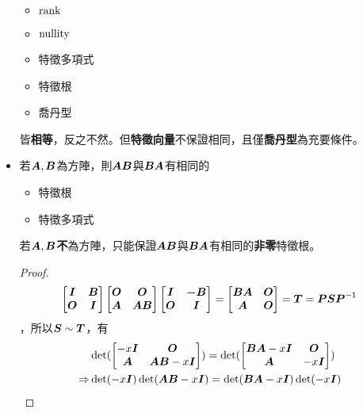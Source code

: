 \begin{itemize}
\begin{itemize}
		\item $\operatorname{rank}$
		\item $\operatorname{nullity}$
		\item 特徵多項式
		\item 特徵根
		\item 喬丹型
	\end{itemize}
    皆\textbf{相等}，反之不然。但\textbf{特徵向量}不保證相同，且僅\textbf{喬丹型}為充要條件。
    \item 若$\boldsymbol{A}, \boldsymbol{B}$為方陣，則$\boldsymbol{AB}$與$\boldsymbol{BA}$有相同的
	\begin{itemize}
		\item 特徵根
		\item 特徵多項式
	\end{itemize}
	若$\boldsymbol{A}, \boldsymbol{B}$\textbf{不}為方陣，只能保證$\boldsymbol{AB}$與$\boldsymbol{BA}$有相同的\textbf{非零}特徵根。 \\
	\begin{proof} \begin{equation}
			\begin{bmatrix}
				\boldsymbol{I} & \boldsymbol{B} \\
				\boldsymbol{O} & \boldsymbol{I}
			\end{bmatrix}
			\begin{bmatrix}
				\boldsymbol{O} & \boldsymbol{O} \\
				\boldsymbol{A} & \boldsymbol{AB}
			\end{bmatrix}
			\begin{bmatrix}
				\boldsymbol{I} & \boldsymbol{-B} \\
				\boldsymbol{O} & \boldsymbol{I}
			\end{bmatrix} = 
			\begin{bmatrix}
				\boldsymbol{BA} & \boldsymbol{O} \\
				\boldsymbol{A} & \boldsymbol{O}
			\end{bmatrix} = \boldsymbol{T} = \boldsymbol{P}\boldsymbol{S}\boldsymbol{P}^{\mathsf{-1}}
		\end{equation}，所以$\boldsymbol{S} \sim \boldsymbol{T}$，有\begin{equation}
			\begin{aligned} 
				& \det(\begin{bmatrix}
					-x\mat{I} & \mat{O} \\
					\mat{A} & \mat{AB} - x\mat{I}
				\end{bmatrix}) = 
				\det(\begin{bmatrix}
					\mat{BA} - x\mat{I} & \mat{O} \\
					\mat{A} & -x\mat{I}
				\end{bmatrix}) \\
				\Rightarrow & \det(-x\mat{I})\det(\mat{AB} - x\mat{I}) = \det(\mat{BA} - x\mat{I})\det(-x\mat{I}) \\

\end{aligned}
\end{equation}
\end{proof}
\end{itemize}

